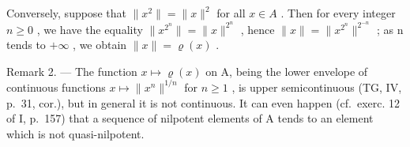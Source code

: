 Conversely, suppose that \(\|x^{2}\|=\|x\|^{2}\) for all \(x\in A\) . Then for every integer \(n\geqslant0\) , we have the equality \(\|x^{2^{n}}\|=\|x\|^{2^{n}}\) , hence \(\|x\|=\|x^{2^{n}}\|^{2^{-n}}\) ; as n tends to \(+\infty\) , we obtain \(\|x\|=\varrho(x)\) .

Remark 2. --- The function \(x \mapsto \varrho(x)\) on A, being the lower envelope of continuous functions \(x \mapsto \|x^n\|^{1/n}\) for \(n \geqslant 1\) , is upper semicontinuous (TG, IV, p.~31, cor.), but in general it is not continuous. It can even happen (cf.~exerc. 12 of I, p.~157) that a sequence of nilpotent elements of A tends to an element which is not quasi-nilpotent.

